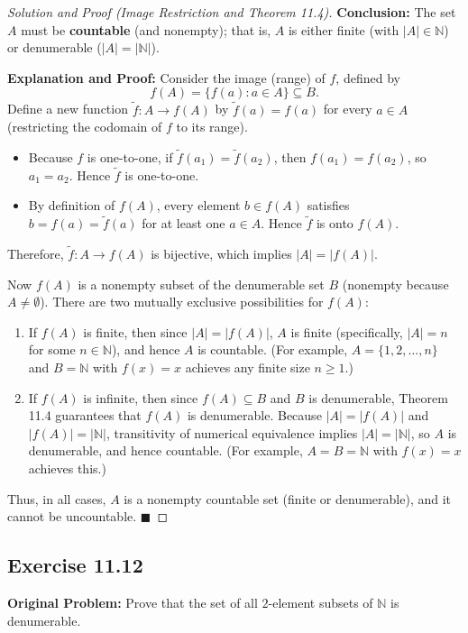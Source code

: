 \documentclass[11pt, letterpaper]{article}
\theoremstyle{definition}
\theoremstyle{remark}
\begin{document}
\begin{proof}[Solution and Proof (Image Restriction and Theorem 11.4)]
\textbf{Conclusion:} The set $A$ must be \textbf{countable} (and nonempty); that is, $A$ is either finite (with $|A| \in \mathbb{N}$) or denumerable ($|A| = |\mathbb{N}|$).

\textbf{Explanation and Proof:} Consider the image (range) of $f$, defined by
\[
f(A) = \{f(a) : a \in A\} \subseteq B.
\]
Define a new function $\tilde{f} : A \to f(A)$ by $\tilde{f}(a) = f(a)$ for every $a \in A$ (restricting the codomain of $f$ to its range).
\begin{itemize}
    \item Because $f$ is one-to-one, if $\tilde{f}(a_1) = \tilde{f}(a_2)$, then $f(a_1) = f(a_2)$, so $a_1 = a_2$. Hence $\tilde{f}$ is one-to-one.
    \item By definition of $f(A)$, every element $b \in f(A)$ satisfies $b = f(a) = \tilde{f}(a)$ for at least one $a \in A$. Hence $\tilde{f}$ is onto $f(A)$.
\end{itemize}
Therefore, $\tilde{f} : A \to f(A)$ is bijective, which implies $|A| = |f(A)|$.

Now $f(A)$ is a nonempty subset of the denumerable set $B$ (nonempty because $A \neq \emptyset$). There are two mutually exclusive possibilities for $f(A)$:
\begin{enumerate}[label=(\arabic*)]
    \item If $f(A)$ is finite, then since $|A| = |f(A)|$, $A$ is finite (specifically, $|A| = n$ for some $n \in \mathbb{N}$), and hence $A$ is countable. (For example, $A = \{1, 2, \dots, n\}$ and $B = \mathbb{N}$ with $f(x) = x$ achieves any finite size $n \geq 1$.)
    \item If $f(A)$ is infinite, then since $f(A) \subseteq B$ and $B$ is denumerable, Theorem 11.4 guarantees that $f(A)$ is denumerable. Because $|A| = |f(A)|$ and $|f(A)| = |\mathbb{N}|$, transitivity of numerical equivalence implies $|A| = |\mathbb{N}|$, so $A$ is denumerable, and hence countable. (For example, $A = B = \mathbb{N}$ with $f(x) = x$ achieves this.)
\end{enumerate}
Thus, in all cases, $A$ is a nonempty countable set (finite or denumerable), and it cannot be uncountable. $\blacksquare$
\end{proof}

\subsection*{Exercise 11.12}
\textbf{Original Problem:} Prove that the set of all $2$-element subsets of $\mathbb{N}$ is denumerable.
\end{document}
